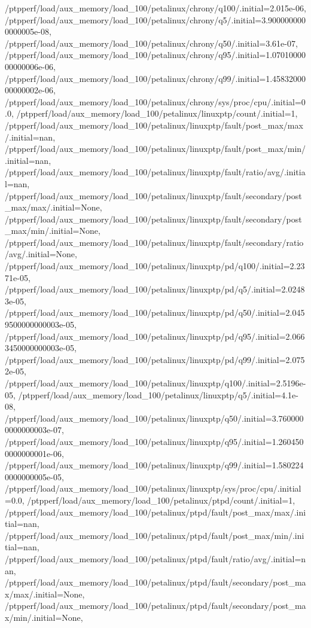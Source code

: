{    /ptpperf/load/aux_memory/load_100/petalinux/chrony/q100/.initial=2.015e-06,
    /ptpperf/load/aux_memory/load_100/petalinux/chrony/q5/.initial=3.9000000000000005e-08,
    /ptpperf/load/aux_memory/load_100/petalinux/chrony/q50/.initial=3.61e-07,
    /ptpperf/load/aux_memory/load_100/petalinux/chrony/q95/.initial=1.0701000000000006e-06,
    /ptpperf/load/aux_memory/load_100/petalinux/chrony/q99/.initial=1.4583200000000002e-06,
    /ptpperf/load/aux_memory/load_100/petalinux/chrony/sys/proc/cpu/.initial=0.0,
    /ptpperf/load/aux_memory/load_100/petalinux/linuxptp/count/.initial=1,
    /ptpperf/load/aux_memory/load_100/petalinux/linuxptp/fault/post_max/max/.initial=nan,
    /ptpperf/load/aux_memory/load_100/petalinux/linuxptp/fault/post_max/min/.initial=nan,
    /ptpperf/load/aux_memory/load_100/petalinux/linuxptp/fault/ratio/avg/.initial=nan,
    /ptpperf/load/aux_memory/load_100/petalinux/linuxptp/fault/secondary/post_max/max/.initial=None,
    /ptpperf/load/aux_memory/load_100/petalinux/linuxptp/fault/secondary/post_max/min/.initial=None,
    /ptpperf/load/aux_memory/load_100/petalinux/linuxptp/fault/secondary/ratio/avg/.initial=None,
    /ptpperf/load/aux_memory/load_100/petalinux/linuxptp/pd/q100/.initial=2.2371e-05,
    /ptpperf/load/aux_memory/load_100/petalinux/linuxptp/pd/q5/.initial=2.02483e-05,
    /ptpperf/load/aux_memory/load_100/petalinux/linuxptp/pd/q50/.initial=2.0459500000000003e-05,
    /ptpperf/load/aux_memory/load_100/petalinux/linuxptp/pd/q95/.initial=2.0663450000000003e-05,
    /ptpperf/load/aux_memory/load_100/petalinux/linuxptp/pd/q99/.initial=2.0752e-05,
    /ptpperf/load/aux_memory/load_100/petalinux/linuxptp/q100/.initial=2.5196e-05,
    /ptpperf/load/aux_memory/load_100/petalinux/linuxptp/q5/.initial=4.1e-08,
    /ptpperf/load/aux_memory/load_100/petalinux/linuxptp/q50/.initial=3.7600000000000003e-07,
    /ptpperf/load/aux_memory/load_100/petalinux/linuxptp/q95/.initial=1.2604500000000001e-06,
    /ptpperf/load/aux_memory/load_100/petalinux/linuxptp/q99/.initial=1.5802240000000005e-05,
    /ptpperf/load/aux_memory/load_100/petalinux/linuxptp/sys/proc/cpu/.initial=0.0,
    /ptpperf/load/aux_memory/load_100/petalinux/ptpd/count/.initial=1,
    /ptpperf/load/aux_memory/load_100/petalinux/ptpd/fault/post_max/max/.initial=nan,
    /ptpperf/load/aux_memory/load_100/petalinux/ptpd/fault/post_max/min/.initial=nan,
    /ptpperf/load/aux_memory/load_100/petalinux/ptpd/fault/ratio/avg/.initial=nan,
    /ptpperf/load/aux_memory/load_100/petalinux/ptpd/fault/secondary/post_max/max/.initial=None,
    /ptpperf/load/aux_memory/load_100/petalinux/ptpd/fault/secondary/post_max/min/.initial=None,
}
